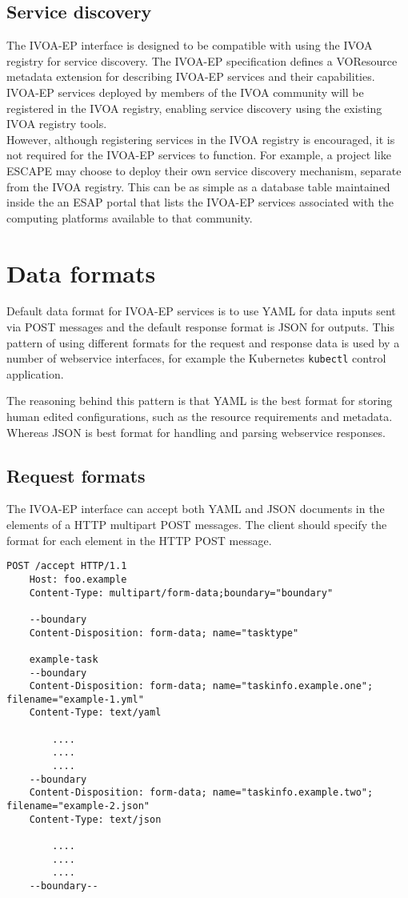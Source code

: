 \documentclass[11pt,a4paper]{ivoa}
\newcommand{\json} {JSON\xspace}
\newcommand{\yaml} {YAML\xspace}
\newcommand{\webservice} {webservice\xspace}
\newcommand{\ivoep} {IVOA-EP\xspace}
\newcommand{\codeword}[1] {\texttt{#1}}
\begin{document}
\subsection{Service discovery}
\label{sec:service-discovery}
The \ivoep interface is designed to be compatible with using the IVOA registry for service discovery.
The \ivoep specification defines a VOResource metadata extension for describing \ivoep services and their capabilities.
\\
\ivoep services deployed by members of the IVOA community will be registered in the IVOA registry, enabling service discovery using the existing IVOA registry tools.
\\
However, although registering services in the IVOA registry is encouraged, it is not required for the \ivoep services to function.
For example, a project like ESCAPE may choose to deploy their own service discovery mechanism, separate from the IVOA registry.
This can be as simple as a database table maintained inside the an ESAP portal that lists the \ivoep services associated with the computing platforms available to that community.

\section{Data formats}
\label{sec:data-formats}
Default data format for \ivoep services is to use
\yaml for data inputs sent via POST messages and the default response format is \json for outputs.
This pattern of using different formats for the request and response data is used by a number of \webservice interfaces, for example the Kubernetes \codeword{kubectl} control application.

The reasoning behind this pattern is that \yaml is the best format for storing human edited configurations, such as the resource requirements and metadata. Whereas \json is best format for handling and parsing \webservice responses.

\subsection{Request formats}
\label{sec:request-formats}
The \ivoep interface can accept both YAML and JSON documents in the elements of a HTTP multipart POST messages. The client should specify the format for each element in the HTTP POST message.
\begin{lstlisting}[]
    POST /accept HTTP/1.1
    Host: foo.example
    Content-Type: multipart/form-data;boundary="boundary"

    --boundary
    Content-Disposition: form-data; name="tasktype"

    example-task
    --boundary
    Content-Disposition: form-data; name="taskinfo.example.one"; filename="example-1.yml"
    Content-Type: text/yaml

        ....
        ....
        ....
    --boundary
    Content-Disposition: form-data; name="taskinfo.example.two"; filename="example-2.json"
    Content-Type: text/json

        ....
        ....
        ....
    --boundary--
\end{lstlisting}
\end{document}
